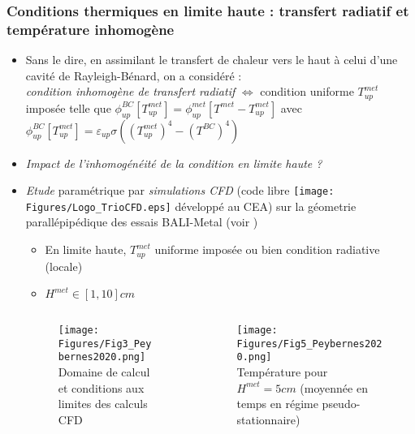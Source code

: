 \subsubsection{Conditions thermiques en limite haute : transfert radiatif et température inhomogène}
\begin{frame}[fragile]
\begin{itemize}
\item Sans le dire, en assimilant le transfert de chaleur vers le haut à celui d'une cavité de Rayleigh-Bénard, on a considéré : \\
\emph{condition inhomogène de transfert radiatif} $\Leftrightarrow$ condition uniforme $T_{up}^{met}$ imposée telle que $\phi_{up}^{BC}\left[T_{up}^{met}\right] = \phi_{up}^{met}\left[T^{met}-T_{up}^{met}\right]$ avec $\phi^{BC}_{up}\left[T^{met}_{up}\right]=\varepsilon_{up}\sigma\left(\left(T^{met}_{up}\right)^4-\left(T^{BC}\right)^4\right)$
\item \emph{Impact de l'inhomogénéité de la condition en limite haute ?}
\item \emph{Etude} paramétrique par \emph{simulations CFD} (code libre \texttt{[image: Figures/Logo\_TrioCFD.eps]} développé au CEA) sur la géometrie parallépipédique des essais BALI-Metal (voir \cite{Peybernes2020})
\begin{itemize}
\item En limite haute, $T_{up}^{met}$ uniforme imposée ou bien condition radiative (locale)
\item $H^{met} \in [1, 10]cm$
\end{itemize}
\begin{columns}[T]
    \begin{column}{0.7\textwidth}
\begin{figure}[H]
\centering \texttt{[image: Figures/Fig3\_Peybernes2020.png]} \\
{\tiny Domaine de calcul et conditions aux limites des calculs CFD}
\end{figure}
    \end{column}
    \begin{column}{0.3\textwidth}
\begin{figure}[H]
\centering \texttt{[image: Figures/Fig5\_Peybernes2020.png]} \\
{\tiny Température pour $H^{met}=5cm$ (moyennée en temps en régime pseudo-stationnaire)}
\end{figure}
    \end{column}
    \end{columns}
\end{itemize}
\end{frame}
